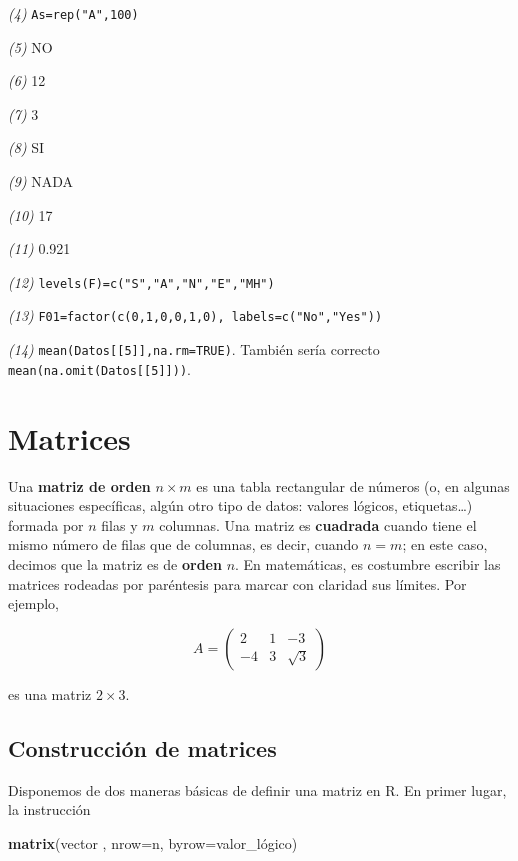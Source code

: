 \documentclass[]{book}
\newenvironment{Shaded}{\begin{snugshade}}{\end{snugshade}}
\newcommand{\DataTypeTok}[1]{\textcolor[rgb]{0.13,0.29,0.53}{#1}}
\newcommand{\KeywordTok}[1]{\textcolor[rgb]{0.13,0.29,0.53}{\textbf{#1}}}
\newcommand{\NormalTok}[1]{#1}
\theoremstyle{definition}
\theoremstyle{definition}
\theoremstyle{definition}
\theoremstyle{remark}
\begin{document}
\emph{(4)} \texttt{As=rep("A",100)}

\emph{(5)} NO

\emph{(6)} 12

\emph{(7)} 3

\emph{(8)} SI

\emph{(9)} NADA

\emph{(10)} 17

\emph{(11)} 0.921

\emph{(12)} \texttt{levels(F)=c("S","A","N","E","MH")}

\emph{(13)} \texttt{F01=factor(c(0,1,0,0,1,0),\ labels=c("No","Yes"))}

\emph{(14)} \texttt{mean(Datos{[}{[}5{]}{]},na.rm=TRUE)}. También sería correcto \texttt{mean(na.omit(Datos{[}{[}5{]}{]}))}.

\hypertarget{chap:matrix}{%
\chapter{Matrices}\label{chap:matrix}}

Una \textbf{matriz de orden} \(n\times m\) es una tabla
rectangular de números (o, en algunas situaciones específicas, algún otro tipo de datos: valores lógicos, etiquetas\ldots{}) formada por \(n\) filas y \(m\) columnas. Una matriz es \textbf{cuadrada} cuando tiene el mismo número de filas que de columnas, es decir, cuando \(n=m\); en este caso, decimos que la matriz es de \textbf{orden} \(n\). En matemáticas, es costumbre escribir las matrices rodeadas por paréntesis para marcar con claridad sus límites. Por ejemplo,

\[
A = \left(\begin{matrix}
2 & 1 & -3\\ -4 & 3 & \sqrt{3}\end{matrix}
\right)
\]

es una matriz \(2\times 3\).

\hypertarget{construccion-de-matrices}{%
\section{Construcción de matrices}\label{construccion-de-matrices}}

Disponemos de dos maneras básicas de definir una matriz en R. En primer lugar, la instrucción

\begin{Shaded}
\begin{Highlighting}[]
\KeywordTok{matrix}\NormalTok{(vector , }\DataTypeTok{nrow=}\NormalTok{n, }\DataTypeTok{byrow=}\NormalTok{valor_lógico)}
\end{Highlighting}
\end{Shaded}
\end{document}
